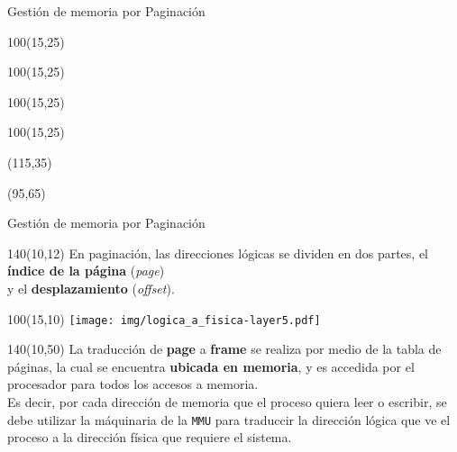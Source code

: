 \documentclass[aspectratio=169]{beamer}
\begin{document}
\begin{frame}[t]{Gestión de memoria por Paginación}
    \begin{textblock}{100}(15,25)  \end{textblock} %
    \begin{textblock}{100}(15,25)  \end{textblock} %
    \begin{textblock}{100}(15,25)  \end{textblock} %
    \begin{textblock}{100}(15,25)  \end{textblock} %
    \begin{textblock}{40}(115,35)
    \end{textblock}
    \begin{textblock}{60}(95,65)
    \end{textblock}
\end{frame}

\begin{frame}[t]{Gestión de memoria por Paginación}
    \begin{textblock}{140}(10,12)
    En paginación, las direcciones lógicas se dividen en dos partes,
    el \textcolor{naranjauca}{\textbf{índice de la página}} (\emph{page})\\
    y el \textcolor{naranjauca}{\textbf{desplazamiento}} (\emph{offset}).
    \end{textblock}
    \begin{textblock}{100}(15,10)
    \texttt{[image: img/logica\_a\_fisica-layer5.pdf]}
    \end{textblock}
    \begin{textblock}{140}(10,50) 
    La traducción de \textbf{page} a \textbf{frame} se realiza por medio de la tabla de páginas,
    la cual se encuentra \textbf{ubicada en memoria}, y es accedida por el procesador para todos los accesos a memoria.\\
    \medskip
    \textcolor{verdeuca}{Es decir, por cada dirección de memoria que el proceso quiera leer o escribir, se debe utilizar la máquinaria de la \texttt{MMU} 
    para traduccir la dirección lógica que ve el proceso a la dirección física que requiere el sistema.}
    \end{textblock}
\end{frame}
\end{document}
